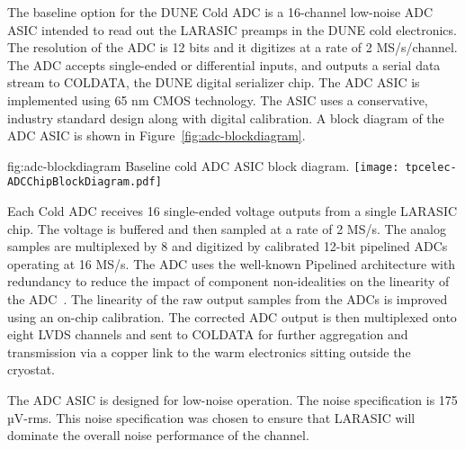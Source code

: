 The baseline option for the DUNE Cold ADC is a 16-channel low-noise ADC ASIC intended to read out the LARASIC preamps in the DUNE cold electronics. The resolution of the ADC is 12 bits and it digitizes at a rate of 2 MS/s/channel. The ADC accepts single-ended or differential inputs, and outputs a serial data stream to COLDATA, the DUNE digital serializer chip. The ADC ASIC is implemented using 65 nm CMOS technology. The ASIC uses a conservative, industry standard design along with digital calibration. A block diagram of the ADC ASIC is shown in Figure~\ref{fig:adc-blockdiagram}.

\begin{dunefigure}
{fig:adc-blockdiagram}
{Baseline cold ADC ASIC block diagram.}
\texttt{[image: tpcelec-ADCChipBlockDiagram.pdf]}
\end{dunefigure}

Each Cold ADC receives 16 single-ended voltage outputs from a single LARASIC chip. The voltage is buffered and then sampled at a rate of 2 MS/s. The analog samples are multiplexed by 8 and digitized by calibrated 12-bit pipelined ADCs operating at 16 MS/s. The ADC uses the well-known Pipelined architecture with redundancy to reduce the impact of component non-idealities on the linearity of the ADC~\cite{121557}. The linearity of the raw output samples from the ADCs is improved using an on-chip calibration. The corrected ADC output is then multiplexed onto eight LVDS channels and sent to COLDATA for further aggregation and transmission via a copper link to the warm electronics sitting outside the cryostat.

The ADC ASIC is designed for low-noise operation. The noise specification is 175 µV-rms. This noise specification was chosen to ensure that LARASIC will dominate the overall noise performance of the channel.

